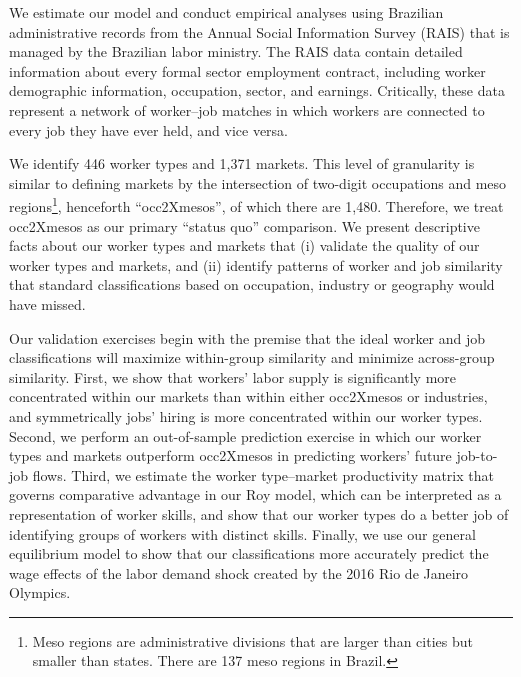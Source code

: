 \documentclass[12pt]{article}
\theoremstyle{definition}
\theoremstyle{plain}
\begin{document}
We estimate our model and conduct empirical analyses using Brazilian administrative records from the Annual Social Information Survey (RAIS) that is managed by the Brazilian labor ministry. The RAIS data contain detailed information about every formal sector employment contract, including worker demographic information, occupation, sector, and earnings. Critically, these data represent a network of worker--job matches in which workers are connected to every job they have ever held, and vice versa.




We identify 446 worker types and 1,371 markets. This level of granularity is similar to defining markets by the intersection of two-digit occupations and meso regions\footnote{Meso regions are administrative divisions that are larger than cities but smaller than states. There are 137 meso regions in Brazil.}, henceforth ``occ2Xmesos'', of which there are 1,480. Therefore, we treat occ2Xmesos as our primary ``status quo'' comparison. We present descriptive facts about our worker types and markets that (i) validate the quality of our worker types and markets, and (ii) identify patterns of worker and job similarity that standard classifications based on occupation, industry or geography would have missed.


Our validation exercises begin with the premise that the ideal worker and job classifications will maximize within-group similarity and minimize across-group similarity. First, we show that workers' labor supply is significantly more concentrated within our markets than within either occ2Xmesos or industries, and symmetrically jobs' hiring is more concentrated within our worker types. Second, we perform an out-of-sample prediction exercise in which our worker types and markets outperform occ2Xmesos in predicting workers' future job-to-job flows. Third, we estimate the worker type--market productivity matrix that governs comparative advantage in our Roy model, which can be interpreted as a representation of worker skills, and show that our worker types do a better job of identifying groups of workers with distinct skills. Finally, we use our general equilibrium model to show that our classifications more accurately predict the wage effects of the labor demand shock created by the 2016 Rio de Janeiro Olympics. 
\end{document}
